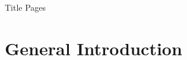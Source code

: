 \documentclass[12pt, a4paper]{report}  %
\begin{document}
% 
\newpage
\thispagestyle{empty} 
Title Pages

\clearpage
\tableofcontents                     
\listoftables                     
\listoffigures                    
%        

%  

%           

\printacronyms[name=Abbreviations]
\clearpage
\renewcommand{\arraystretch}{1.5} %

    
\chapter{General Introduction}
    
    
%     
    
\end{document}
